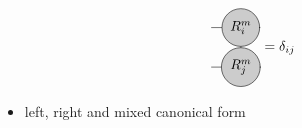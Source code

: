 \documentclass[aspectratio=169]{beamer}
\begin{document}
\begin{frame}
\begin{onlyenv}
\begin{equation}
        \begin{tikzpicture}[baseline={([yshift=-.5ex]current bounding box.center)}]
          \draw[gray, thick] (0,0) -- (0,-1);
          \draw[gray, thick] (0,0) -- (-0.75,0);
          \draw[gray, thick] (0,-1) -- (-0.75,-1);
          \node[draw, circle, line cap=round, fill=black!20, minimum size=12] at (0,0) {$R_i^m$};
          \node[draw, circle, line cap=round, fill=black!20, minimum size=12] at (0,-1) {$R_j^m$};
        \end{tikzpicture} = \delta_{ij}
    \end{equation}
  \end{onlyenv}
  \begin{itemize}
    \item<4> left, right and mixed canonical form 
  \end{itemize}
\end{frame}
\end{document}
